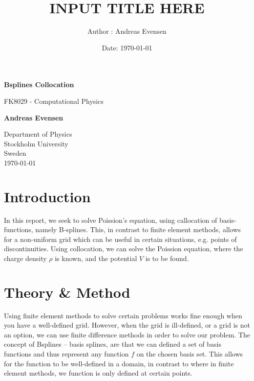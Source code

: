 \documentclass[a4paper]{article}
\title{INPUT TITLE HERE}
\author{Author : Andreas Evensen}
\date{Date: \today}
\begin{document}
\begin{titlepage}
    \begin{center}
        \vspace*{1cm}

        \Huge
        \textbf{Bsplines Collocation}

        \vspace{0.5cm}
        \LARGE
        FK8029 - Computational Physics

        \vspace{1.5cm}

        \textbf{Andreas Evensen}

        \vfill


        \Large
        Department of Physics\\
        Stockholm University\\
        Sweden\\
        \today
    \end{center}
\end{titlepage}

\section{Introduction}
In this report, we seek to solve Poission's equation, using callocation of basis-functions, namely B-splines.
This, in contrast to finite element methods, allows for a non-uniform grid which can be useful in certain situations, e.g. points of discontinuities.
Using collocation, we can solve the Poission equation, where the charge density $\rho$ is known, and the potential $V$ is to be found.


\section{Theory \& Method}
Using finite element methods to solve certain problems works fine enough when you have a well-defined grid.
However, when the grid is ill-defined, or a grid is not an option, we can use finite difference methods in order to solve our problem.
The concept of Bsplines -- basis splines, are that we can defined a set of basis functions and thus represent any function $f$ on the chosen basis set.
This allows for the function to be well-defined in a domain, in contrast to where in finite element methods, we function is only defined at certain points.
\end{document}
